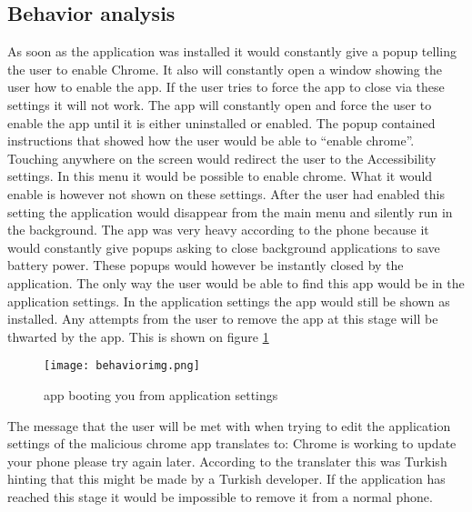 \subsection{Behavior analysis}

As soon as the application was installed it would constantly give a popup telling the user to enable Chrome. 
It also will constantly open a window showing the user how to enable the app. 
If the user tries to force the app to close via these settings it will not work. 
The app will constantly open and force the user to enable the app until it is either uninstalled or enabled.
The popup contained instructions that showed how the user would be able to “enable chrome”. 
Touching anywhere on the screen would redirect the user to the Accessibility settings. 
In this menu it would be possible to enable chrome. 
What it would enable is however not shown on these settings. 
After the user had enabled this setting the application would disappear from the main menu and silently run in the background. 
The app was very heavy according to the phone because it would constantly give popups asking to close background applications to save battery power. 
These popups would however be instantly closed by the application.
The only way the user would be able to find this app would be in the application settings. 
In the application settings the app would still be shown as installed. 
Any attempts from the user to remove the app at this stage will be thwarted by the app.
This is shown on figure \ref{tim-appbehavior}

\begin{figure}[H]
    \centering
    \texttt{[image: behaviorimg.png]}
    \caption{app booting you from application settings}
    \label{tim-appbehavior}
\end{figure}

The message that the user will be met with when trying to edit the application settings of the malicious chrome app translates to: 
Chrome is working to update your phone please try again later.
According to the translater this was Turkish hinting that this might be made by a Turkish developer.
If the application has reached this stage it would be impossible to remove it from a normal phone.
